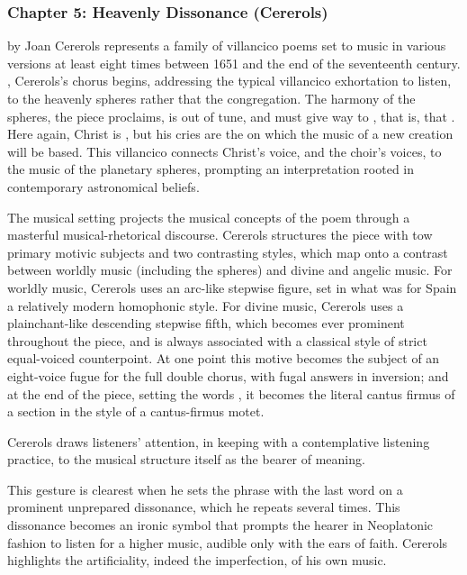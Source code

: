 \documentclass[tt]{vcbook-proposal}
\begin{document}
\subsubsection{Chapter 5: Heavenly Dissonance (Cererols)}

 by Joan Cererols represents a family of villancico poems set to music in various versions at least eight times between 1651 and the end of the seventeenth century.
, Cererols's chorus begins, addressing the typical villancico exhortation to listen, to the heavenly spheres rather that the congregation. 
The harmony of the spheres, the piece proclaims, is out of tune, and must give way to , that is,  that .
Here again, Christ is , but his cries are the  on which the music of a new creation will be based.
This villancico connects Christ's voice, and the choir's voices, to the music of the planetary spheres, prompting an interpretation rooted in contemporary astronomical beliefs.

The musical setting projects the musical concepts of the poem through a masterful musical-rhetorical discourse.
Cererols structures the piece with tow primary motivic subjects and two contrasting styles, which map onto a contrast between worldly music (including the spheres) and divine and angelic music. 
For worldly music, Cererols uses an arc-like stepwise figure, set in what was for Spain a relatively modern homophonic style.
For divine music, Cererols uses a plainchant-like descending stepwise fifth, which becomes ever prominent throughout the piece, and is always associated with a classical style of strict equal-voiced counterpoint.
At one point this motive becomes the subject of an eight-voice fugue for the full double chorus, with fugal answers in inversion; and at the end of the piece, setting the words , it becomes the literal cantus firmus of a section in the style of a cantus-firmus motet.

Cererols draws listeners' attention, in keeping with a contemplative listening practice, to the musical structure itself as the bearer of meaning.

This gesture is clearest when he sets the phrase  with the last word on a prominent unprepared dissonance, which he repeats several times.
This dissonance becomes an ironic symbol that prompts the hearer in Neoplatonic fashion to listen for a higher music, audible only with the ears of faith.
Cererols highlights the artificiality, indeed the imperfection, of his own music.
\end{document}
